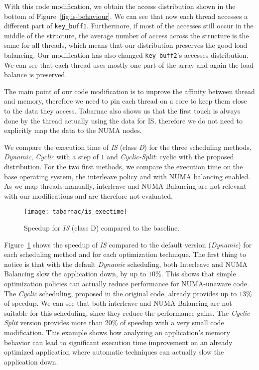 

With this code modification, we obtain the access distribution shown in
the bottom of Figure~\ref{fig:is-behaviour}. We can see that now each thread
accesses a different part of \texttt{key\_buff1}. Furthermore, if most of the
accesses still occur in the middle of the structure, the average number of
access across the structure is the same for all threads, which means that our
distribution preserves the good load balancing. Our modification has also
changed \texttt{key\_buff2}'s accesses distribution. We can see that each
thread uses mostly one part of the array and again the load balance is
preserved.

The main point of our code modification is to improve the affinity between
thread and memory, therefore we need to pin each thread on a core to keep them
close to the data they access. %
\gls{Tabarnac} also shows us that the first touch is always done by the thread actually using
the data for IS, therefore we do not need to explicitly map the data to the NUMA nodes.

We compare the execution time of \emph{IS} (class \emph{D}) for the three scheduling
methods, \emph{Dynamic}, \emph{Cyclic} with a step of $1$ and \emph{Cyclic-Split}:
cyclic with the proposed distribution. For the two first methods, we compare the
execution time on the base operating system, the interleave policy and with
NUMA balancing enabled. As we map threads manually, interleave and NUMA
Balancing are not relevant with our modifications and are therefore not evaluated.

\begin{figure}[!tb]
    \centering
    \texttt{[image: tabarnac/is\_exectime]}
    \caption{Speedup for \emph{IS} (class D) compared to the baseline.}
\label{fig:is-res}
\end{figure}

Figure~\ref{fig:is-res} shows the speedup of \emph{IS} compared to
the default version (\emph{Dynamic}) for each scheduling method and for each
optimization technique. The first thing to notice is that with the default
\emph{Dynamic} scheduling, both Interleave and NUMA Balancing slow
the application down, by up to $10\%$. This shows that simple optimization policies can actually reduce performance
for NUMA-unaware code.
The \emph{Cyclic} scheduling, proposed in the original code, already provides up to $13\%$ of
speedup. We can see that both interleave and NUMA Balancing are not suitable
for this scheduling, since they reduce the performance gains.
The \emph{Cyclic-Split} version provides more than $20\%$ of speedup with a very small code
modification.
This example shows how analyzing an application's memory behavior can lead to
significant execution time improvement on an already optimized application where automatic techniques can actually slow
the application down.




